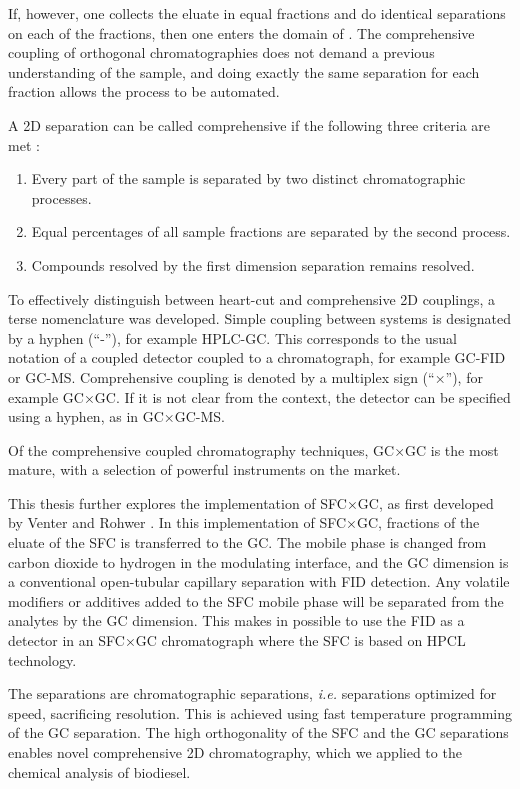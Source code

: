 If, however, one collects the eluate in equal fractions and do identical
separations on each of the fractions, then one enters the domain of
. The comprehensive coupling of
orthogonal chromatographies does not demand a previous understanding of the
sample, and doing exactly the same separation for each fraction allows the
process to be automated.

A 2D separation can be called comprehensive if the following three criteria are
met \autocite{Giddings1987}:

\begin{enumerate}
  \item Every part of the sample is separated by two distinct chromatographic processes.
  \item Equal percentages of all sample fractions are separated by the second process.	 
  \item Compounds resolved by the first dimension separation remains resolved.  
\end{enumerate} 

To effectively distinguish between heart-cut and comprehensive 2D couplings, a
terse nomenclature was developed. Simple coupling between systems is
designated by a hyphen (``-''), for example HPLC-GC. This corresponds to the
usual notation of a coupled detector coupled to a chromatograph, for example
GC-FID or GC-MS. Comprehensive coupling is denoted by a multiplex sign
(``×''), for example GC×GC. If it is not clear from the context,
the detector can be specified using a hyphen, as in GC×GC-MS.

Of the comprehensive coupled chromatography techniques, GC×GC is the most
mature, with a selection of powerful instruments on the market.

This thesis further explores the implementation of SFC×GC, as first developed by
Venter and Rohwer \autocite{Venter2004, Venter2006}. In this implementation of
SFC×GC, fractions of the eluate of the SFC is transferred to the GC. The mobile
phase is changed from carbon dioxide to hydrogen in the modulating interface,
and the GC dimension is a conventional open-tubular capillary separation with
FID detection. Any volatile modifiers or additives added to the SFC mobile phase
will be separated from the analytes by the GC dimension. This makes in possible
to use the FID as a detector in an SFC×GC chromatograph where the SFC is based
on HPCL technology.

The \twoD separations are  chromatographic separations,
\textit{i.e.} separations optimized for speed, sacrificing resolution. This is
achieved using fast temperature programming of the GC separation. The high
orthogonality of the SFC and the GC separations enables novel comprehensive 2D
chromatography, which we applied to the chemical analysis of biodiesel.
